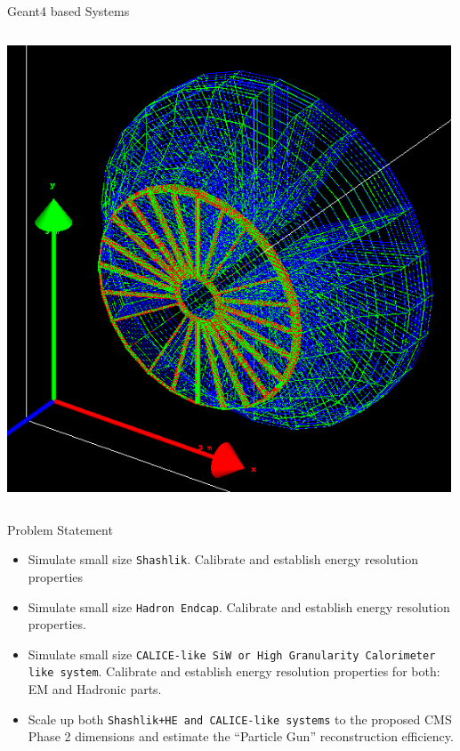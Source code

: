 \documentclass[pdf, 9pt]{beamer}
\begin{document}
\begin{frame}{Geant4 based Systems}
\begin{columns}[T]
\begin{column}{0.3\textwidth}
\begin{flushright}
          \includegraphics[width=0.99\textwidth, height=0.4\textheight]{figs/shashlik_fullscale/Shashlik+HE_Complete_Wire.png}
        \end{flushright}
      \end{column}
    \end{columns}
  \end{frame}


  \begin{frame}{Problem Statement}
    \begin{itemize}
      \item Simulate small size \texttt{Shashlik}. Calibrate and establish energy resolution properties
      \item Simulate small size \texttt{Hadron Endcap}. Calibrate and establish energy resolution properties.
      \item Simulate small size \texttt{CALICE-like SiW or High Granularity Calorimeter like system}. Calibrate and establish energy resolution properties for both: EM and Hadronic parts.
      \item Scale up both \texttt{Shashlik+HE and CALICE-like systems} to the proposed CMS Phase 2 dimensions and estimate the ``Particle Gun'' reconstruction efficiency.
    \end{itemize}
  \end{frame}
\end{document}
